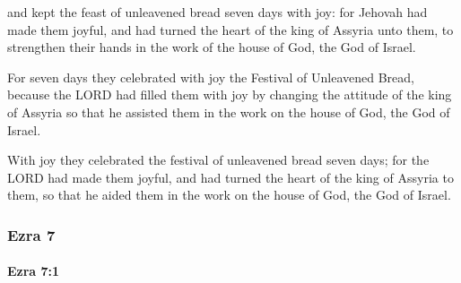 			\begin{versebox}
					\item[BHS] 
					\item[LXX] 
					\item[ASV] and kept the feast of unleavened bread seven days with joy: for Jehovah had made them joyful, and had turned the heart of the king of Assyria unto them, to strengthen their hands in the work of the house of God, the God of Israel.
					\item[NIV] For seven days they celebrated with joy the Festival of Unleavened Bread, because the LORD had filled them with joy by changing the attitude of the king of Assyria so that he assisted them in the work on the house of God, the God of Israel.
					\item[NRSV] With joy they celebrated the festival of unleavened bread seven days; for the LORD had made them joyful, and had turned the heart of the king of Assyria to them, so that he aided them in the work on the house of God, the God of Israel.
			\end{versebox}
	\subsubsection{Ezra 7} %
		\label{EZRA-7}

		\paragraph{Ezra 7:1} %
			\label{EZRA-7-1}

